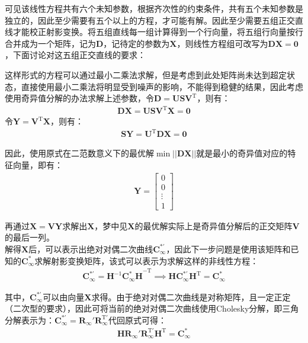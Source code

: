 \documentclass[11pt]{article}
\begin{document}
\par
可见该线性方程共有六个未知参数，根据齐次性的约束条件，共有五个未知参数是独立的，因此至少需要有五个以上的方程，才可能有解。因此至少需要五组正交直线才能校正射影变换。将五组直线每一组计算得到一个行向量，将五组行向量按行合并成为一个矩阵，记为$\mathbf{D}$，记待定的参数为$\mathbf{X}$，则线性方程组可改写为$\mathbf{DX=0}$，下面讨论对这五组正交直线的要求：\par
这样形式的方程可以通过最小二乘法求解，但是考虑到此处矩阵尚未达到超定状态，直接使用最小二乘法将明显受到噪声的影响，不能得到稳健的结果，因此考虑使用奇异值分解的办法求解上述参数，令$\mathbf{D=USV^\mathrm{T}}$，则有：
\begin{align*}
  \mathbf{DX}=\mathbf{USV^\mathrm{T}X}=\mathbf{0}
\end{align*}
令$\mathbf{Y=V^\mathrm{T}X}$，则有：
\begin{align*}
  \mathbf{SY}=\mathbf{U^\mathrm{T}DX}=\mathbf{0}
\end{align*}\par
因此，使用原式在二范数意义下的最优解$\min||\mathbf{DX}||$就是最小的奇异值对应的特征向量，即有：
\begin{align*}
  \mathbf{Y}=\begin{bmatrix}
               0 \\0\\\vdots\\1
             \end{bmatrix}
\end{align*}\par
再通过$\mathbf{X=VY}$求解出$\mathbf{X}$，梦中见$\mathbf{X}$的最优解实际上是奇异值分解后的正交矩阵$\mathbf{V}$的最后一列。\\
解得$\mathbf{X}$后，可以表示出绝对对偶二次曲线$\mathbf{C_\infty^{*'}}$，因此下一步问题是使用该矩阵和已知的$\mathbf{C_\infty^{*}}$求解射影变换矩阵，该式可以表示为求解这样的非线性方程：
\begin{align}
  \mathbf{C_\infty^{*'}}=\mathbf{H}^{-1}\mathbf{C_\infty^*H}^{-\textrm{T}}  \implies\mathbf{H}\mathbf{C_\infty^{*'}}\mathbf{H}^\mathrm{T}=\mathbf{C_\infty^*}
\end{align}\par
其中，$\mathbf{C_\infty^{*'}}$可以由向量$\mathbf{X}$求得。由于绝对对偶二次曲线是对称矩阵，且一定正定（二次型的要求），因此可将当前的绝对对偶二次曲线使用Cholesky分解，即三角分解表示为：$\mathbf{C_\infty^{*'}}=\mathbf{R_\infty' R_\infty^\mathrm{T'}}$代回原式可得：
\begin{align}
  \mathbf{HR_\infty' R_\infty^\mathrm{T'} H^\mathrm{T}=C_\infty^*}
  \label{eq:C_infty_SVD}
\end{align}\par
\end{document}
